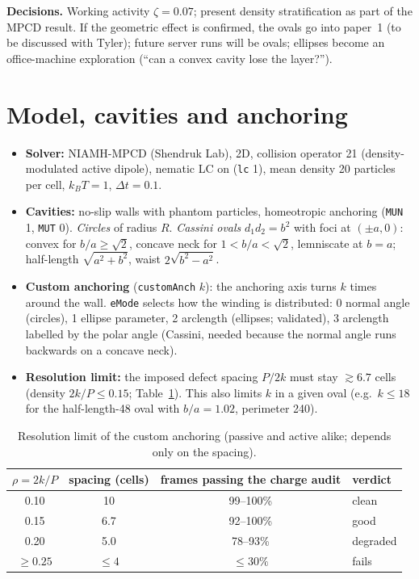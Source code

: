 \documentclass[11pt,a4paper]{article}
\begin{document}
\textbf{Decisions.} Working activity $\zeta=0.07$; present density stratification as part of the MPCD result.
If the geometric effect is confirmed, the ovals go into paper~1 (to be discussed with Tyler); future server runs
will be ovals; ellipses become an office-machine exploration (``can a convex cavity lose the layer?'').

\section{Model, cavities and anchoring}
\begin{itemize}
  \item \textbf{Solver:} NIAMH-MPCD (Shendruk Lab), 2D, collision operator 21 (density-modulated active dipole),
        nematic LC on (\texttt{lc} 1), mean density 20 particles per cell, $k_BT=1$, $\Delta t=0.1$.
  \item \textbf{Cavities:} no-slip walls with phantom particles, homeotropic anchoring
        (\texttt{MUN} 1, \texttt{MUT} 0).
        \emph{Circles} of radius $R$. \emph{Cassini ovals} $d_1 d_2 = b^2$ with foci at $(\pm a,0)$: convex for
        $b/a\ge\sqrt2$, concave neck for $1<b/a<\sqrt2$, lemniscate at $b=a$; half-length $\sqrt{a^2+b^2}$,
        waist $2\sqrt{b^2-a^2}$.
  \item \textbf{Custom anchoring} (\texttt{customAnch} $k$): the anchoring axis turns $k$ times around the wall.
        \texttt{eMode} selects how the winding is distributed: 0 normal angle (circles), 1 ellipse parameter,
        2 arclength (ellipses; validated), 3 arclength labelled by the polar angle (Cassini, needed because the
        normal angle runs backwards on a concave neck).
  \item \textbf{Resolution limit:} the imposed defect spacing $P/2k$ must stay $\gtrsim 6.7$ cells
        (density $2k/P\le0.15$; Table~\ref{tab:res}). This also limits $k$ in a given oval (e.g.\ $k\le18$ for the
        half-length-48 oval with $b/a=1.02$, perimeter 240).
\end{itemize}

\begin{table}[h]\centering\small
\caption{Resolution limit of the custom anchoring (passive and active alike; depends only on the spacing).}\label{tab:res}
\begin{tabular}{cccl}\toprule
$\rho=2k/P$ & spacing (cells) & frames passing the charge audit & verdict\\\midrule
0.10 & 10  & 99--100\% & clean\\
0.15 & 6.7 & 92--100\% & good\\
0.20 & 5.0 & 78--93\%  & degraded\\
$\ge0.25$ & $\le4$ & $\le30\%$ & fails\\\bottomrule
\end{tabular}
\end{table}
\end{document}
